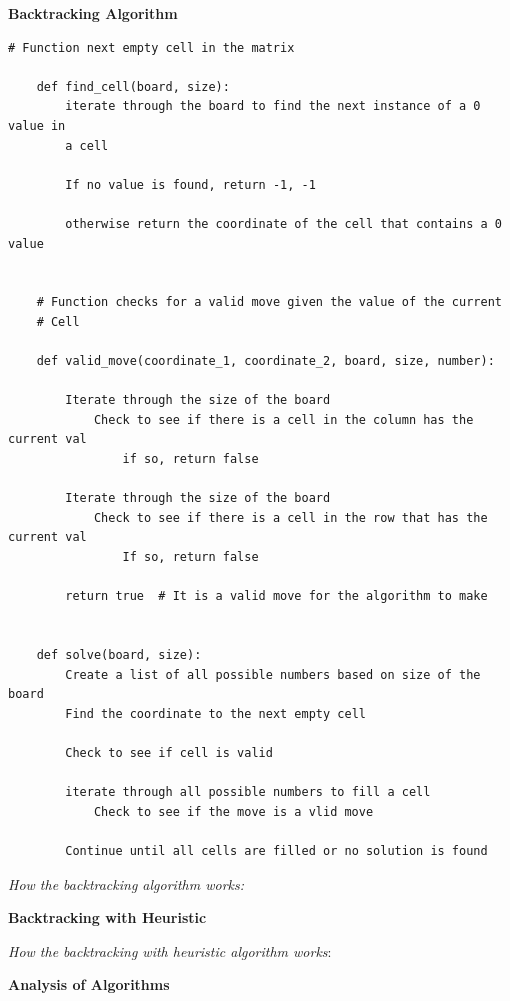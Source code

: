 \documentclass{article}
\begin{document}
\pagebreak

\noindent \textbf{Backtracking Algorithm}

\begin{lstlisting}[frame=single]
	# Function next empty cell in the matrix
	
	def find_cell(board, size):
		iterate through the board to find the next instance of a 0 value in
		a cell
	
		If no value is found, return -1, -1
	
		otherwise return the coordinate of the cell that contains a 0 value	
	
	
	# Function checks for a valid move given the value of the current
	# Cell
	
	def valid_move(coordinate_1, coordinate_2, board, size, number):
	
		Iterate through the size of the board
			Check to see if there is a cell in the column has the current val
				if so, return false
	
		Iterate through the size of the board
			Check to see if there is a cell in the row that has the current val
				If so, return false
	
		return true  # It is a valid move for the algorithm to make
	
	
	def solve(board, size):
		Create a list of all possible numbers based on size of the board
		Find the coordinate to the next empty cell
		
		Check to see if cell is valid
	
		iterate through all possible numbers to fill a cell
			Check to see if the move is a vlid move
		
		Continue until all cells are filled or no solution is found
\end{lstlisting}

\textit{How the backtracking algorithm works:} \\

\pagebreak

\noindent \textbf{Backtracking with Heuristic}


\textit{How the backtracking with heuristic algorithm works}: \\


\pagebreak

\noindent \textbf{Analysis of Algorithms}
\end{document}

